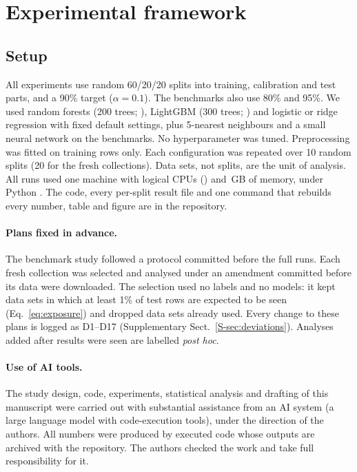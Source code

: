 \section{Experimental framework}\label{sec:framework}

\subsection{Setup}
All experiments use random 60/20/20 splits into training, calibration and test parts, and a 90\% target ($\alpha=0.1$). The benchmarks also use 80\% and 95\%. We used random forests (200 trees; \citealp{breiman2001}), LightGBM (300 trees; \citealp{ke2017}) and logistic or ridge regression with fixed default settings, plus 5-nearest neighbours and a small neural network on the benchmarks. No hyperparameter was tuned. Preprocessing was fitted on training rows only. Each configuration was repeated over 10 random splits (20 for the fresh collections). Data sets, not splits, are the unit of analysis. All runs used one machine with \NHwNcpu{} logical CPUs (\NHwCpu{}) and \NHwRam{}\,GB of memory, under Python \NHwPython{}. The code, every per-split result file and one command that rebuilds every number, table and figure are in the repository.

\paragraph{Plans fixed in advance.} The benchmark study followed a protocol committed before the full runs. Each fresh collection was selected and analysed under an amendment committed before its data were downloaded. The selection used no labels and no models: it kept data sets in which at least 1\% of test rows are expected to be seen (Eq.~\ref{eq:exposure}) and dropped data sets already used. Every change to these plans is logged as D1--D17 (Supplementary Sect.~\ref{S-sec:deviations}). Analyses added after results were seen are labelled \emph{post hoc}.

\paragraph{Use of AI tools.} The study design, code, experiments, statistical analysis and drafting of this manuscript were carried out with substantial assistance from an AI system (a large language model with code-execution tools), under the direction of the authors. All numbers were produced by executed code whose outputs are archived with the repository. The authors checked the work and take full responsibility for it.

